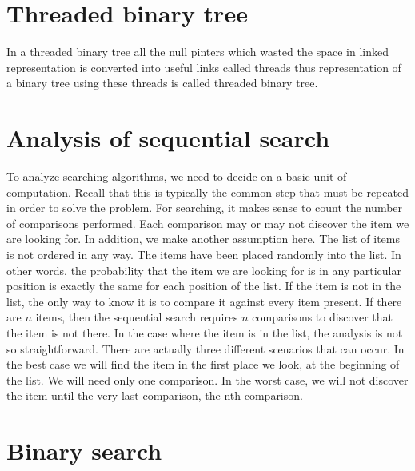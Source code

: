 \documentclass{article}
\begin{document}
\begin{}
\section{Threaded binary tree}

In a threaded binary tree all the null pinters which
wasted the space in linked representation is converted
into useful links called threads thus representation of a
binary tree using these threads is called threaded
binary tree. 
\section{Analysis of sequential search}

To analyze searching algorithms, we need to decide
on a basic unit of computation. Recall that this is
typically the common step that must be repeated in
order to solve the problem. For searching, it makes
sense to count the number of comparisons performed.
Each comparison may or may not discover the item
we are looking for. In addition, we make another
assumption here. The list of items is not ordered in
any way. The items have been placed randomly into
the list. In other words, the probability that the item
we are looking for is in any particular position is
exactly the same for each position of the list.
If the item is not in the list, the only way to know it is
to compare it against every item present. If there are
\(n\) items, then the sequential search requires \(n\)
comparisons to discover that the item is not there. In
the case where the item is in the list, the analysis is
not so straightforward. There are actually three
different scenarios that can occur. In the best case we
will find the item in the first place we look, at the
beginning of the list. We will need only one
comparison. In the worst case, we will not discover
the item until the very last comparison, the nth
comparison.

\section{Binary search}


\end{}
\end{document}
